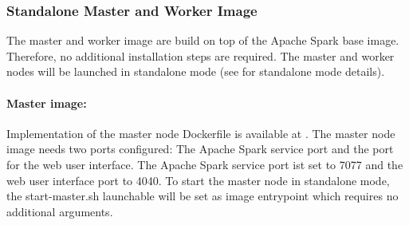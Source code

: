






\subsubsection{Standalone Master and Worker Image}
The master and worker image are build on top of the  Apache Spark base image.
Therefore, no additional installation steps are required.
The master and worker nodes will be launched in standalone mode (see  for standalone mode details).


\paragraph{Master image:}
Implementation of the master node Dockerfile is available at .
The master node image needs two ports configured: The Apache Spark service port and the port for the web user interface.
The Apache Spark service port ist set to 7077 and the web user interface port to 4040. 
To start the master node in standalone mode, the start-master.sh launchable will be set as image entrypoint which requires no additional arguments.


